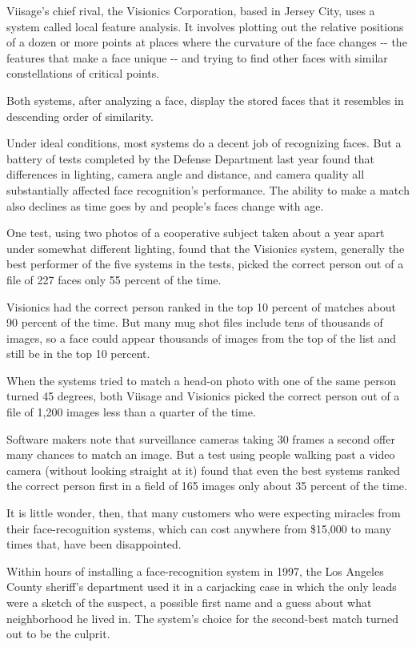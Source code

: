 Viisage's chief rival, the Visionics Corporation, based in Jersey City,
uses a system called local feature analysis. It involves plotting out
the relative positions of a dozen or more points at places where the
curvature of the face changes -\/- the features that make a face unique
-\/- and trying to find other faces with similar constellations of
critical points.

Both systems, after analyzing a face, display the stored faces that it
resembles in descending order of similarity.

Under ideal conditions, most systems do a decent job of recognizing
faces. But a battery of tests completed by the Defense Department last
year found that differences in lighting, camera angle and distance, and
camera quality all substantially affected face recognition's
performance. The ability to make a match also declines as time goes by
and people's faces change with age.

One test, using two photos of a cooperative subject taken about a year
apart under somewhat different lighting, found that the Visionics
system, generally the best performer of the five systems in the tests,
picked the correct person out of a file of 227 faces only 55 percent of
the time.

Visionics had the correct person ranked in the top 10 percent of matches
about 90 percent of the time. But many mug shot files include tens of
thousands of images, so a face could appear thousands of images from the
top of the list and still be in the top 10 percent.

When the systems tried to match a head-on photo with one of the same
person turned 45 degrees, both Viisage and Visionics picked the correct
person out of a file of 1,200 images less than a quarter of the time.

Software makers note that surveillance cameras taking 30 frames a second
offer many chances to match an image. But a test using people walking
past a video camera (without looking straight at it) found that even the
best systems ranked the correct person first in a field of 165 images
only about 35 percent of the time.

It is little wonder, then, that many customers who were expecting
miracles from their face-recognition systems, which can cost anywhere
from \$15,000 to many times that, have been disappointed.

Within hours of installing a face-recognition system in 1997, the Los
Angeles County sheriff's department used it in a carjacking case in
which the only leads were a sketch of the suspect, a possible first name
and a guess about what neighborhood he lived in. The system's choice for
the second-best match turned out to be the culprit.

